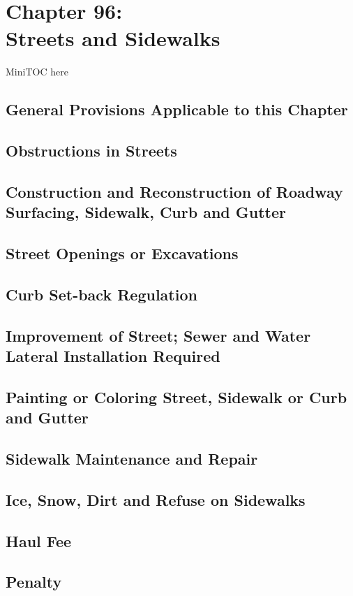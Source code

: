 \documentclass[code.tex]{subfiles}
\begin{document}
\chapter*{Chapter 96: \\
	Streets and Sidewalks}

MiniTOC here
\pagebreak
\section{General Provisions Applicable to this Chapter}
\section{Obstructions in Streets}
\section{Construction and Reconstruction of Roadway Surfacing, Sidewalk, Curb and Gutter}
\section{Street Openings or Excavations}
\section{Curb Set-back Regulation}
\section{Improvement of Street; Sewer and Water Lateral Installation Required}
\section{Painting or Coloring Street, Sidewalk or Curb and Gutter}
\section{Sidewalk Maintenance and Repair}
\section{Ice, Snow, Dirt and Refuse on Sidewalks}
\section{Haul Fee}

\setcounter{section}{98}
\section{Penalty}
\end{document}
